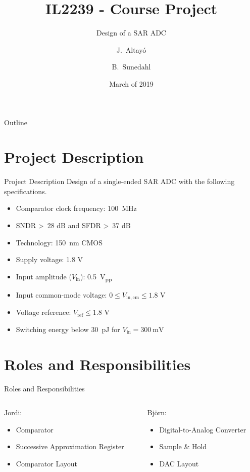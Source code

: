 \documentclass{beamer}
\title{IL2239 - Course Project}
\subtitle{Design of a SAR ADC}
\author{J.~Altayó \and B.~Sunedahl}
\date{March of 2019}
\newcommand*{\subb}[1]{\ensuremath{_{\mathrm{#1}}}}
\begin{document}
 \section*{}
 \begin{frame}[plain, t]
  \titlepage
 \end{frame}
 
 \begin{frame}{Outline}
  \begin{multicols}{2}
   \tableofcontents
  \end{multicols}
 \end{frame}
 \section{Project Description}
 \begin{frame}{Project Description}
  Design of a single-ended SAR ADC with the following specifications.
  \begin{itemize}
   \item Comparator clock frequency: \SI{100}{\MHz}
   \item SNDR \textgreater\ 28 dB and SFDR \textgreater\ 37 dB
   \item Technology: \SI{150}{\nm} CMOS
   \item Supply voltage: 1.8 V
   \item Input amplitude ($V\subb{in}$): \SI{0.5}{\volt_{pp}}
   \item Input common-mode voltage: $0 \leq V\subb{in,cm} \leq 1.8$ V
   \item Voltage reference: $V\subb{ref} \leq 1.8$ V
   \item Switching energy below \SI{30}{\pico\joule} for $V\subb{in}=\SI{300}{\mV}$
  \end{itemize}
 \end{frame}
 
 \section{Roles and Responsibilities}
 \begin{frame}{Roles and Responsibilities}
  \begin{columns}
   \begin{column}{0.5\textwidth}
    Jordi:
    \begin{itemize}
     \item Comparator
     \item Successive Approximation Register
     \item Comparator Layout
    \end{itemize}
   \end{column}
   \begin{column}{0.5\textwidth}
    Björn:
    \begin{itemize}
     \item Digital-to-Analog Converter
     \item Sample \& Hold
     \item DAC Layout
    \end{itemize}
   \end{column}
  \end{columns}
 \end{frame}
\end{document}
